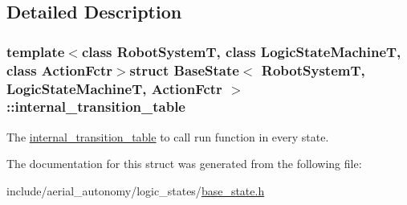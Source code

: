 \subsection{Detailed Description}
\subsubsection*{template$<$class Robot\-System\-T, class Logic\-State\-Machine\-T, class Action\-Fctr$>$struct Base\-State$<$ Robot\-System\-T, Logic\-State\-Machine\-T, Action\-Fctr $>$\-::internal\-\_\-transition\-\_\-table}

The \hyperlink{structBaseState_1_1internal__transition__table}{internal\-\_\-transition\-\_\-table} to call run function in every state. 

The documentation for this struct was generated from the following file\-:\begin{DoxyCompactItemize}
\item 
include/aerial\-\_\-autonomy/logic\-\_\-states/\hyperlink{base__state_8h}{base\-\_\-state.\-h}\end{DoxyCompactItemize}
